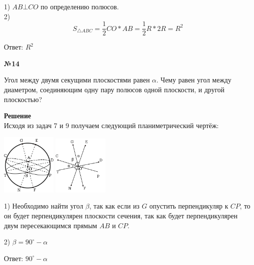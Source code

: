     1) $AB \bot CO$ по определению полюсов.\\

    2)\[
          S_{\triangle ABC} = \frac{1}{2} CO * AB = \frac{1}{2} R * 2R = R ^ 2
    \]

    Ответ: $R ^ 2$
    \begin{center}
        \textbf{№14}
    \end{center}

    Угол между двумя секущими плоскостями равен $\alpha$.
    Чему равен угол между диаметром, соединяющим одну пару полюсов одной плоскости, и другой плоскостью?

    \textbf{Решение}\\

    Исходя из задач 7 и 9 получаем следующий планиметрический чертёж:

    \begin{center}
        \includegraphics[width=0.2\textwidth]{images/img7} \quad
        \includegraphics[width=0.2\textwidth]{images/img8}\\
    \end{center}

    1) Необходимо найти угол $\beta$, так как если из $G$ опустить перпендикуляр к $CP$, то он будет перпендикулярен
    плоскости сечения, так как будет перпендикулярен двум пересекающимся прямым $AB$ и $CP$.

    2) $\beta = 90^\circ - \alpha$

    Ответ: $90^\circ - \alpha$



